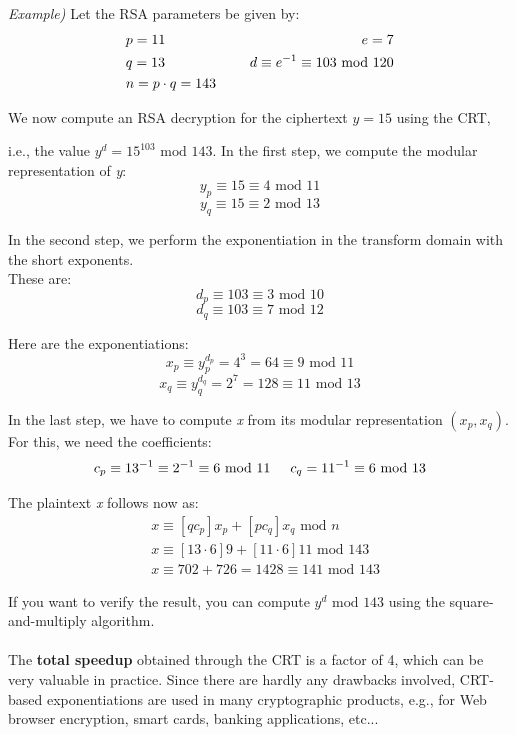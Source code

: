 \documentclass[11pt, a4paper]{article}
\newcommand{\mymod}{
    \text{ mod }
}
\begin{document}
\textit{Example)} Let the RSA parameters be given by:
\begin{alignat*}{2}
    &p=11 \hspace{0.5cm}&e=7\\
    &q=13 \hspace{0.5cm}&d\equiv e^{-1}\equiv103\mymod120\\
    &n=p\cdot q=143 \hspace{0.5cm}&
\end{alignat*}

We now compute an RSA decryption for the ciphertext $y=15$ using the CRT,

i.e., the value $y^d=15^{103}\mymod143$. In the first step, we compute the modular representation of \textit{y}:
$$y_p\equiv15\equiv4\mymod 11$$
$$y_q\equiv15\equiv2\mymod 13$$

In the second step, we perform the exponentiation in the transform domain with the short exponents.\\

These are:
$$d_p\equiv103\equiv3\mymod10$$
$$d_q\equiv103\equiv7\mymod12$$

Here are the exponentiations:
$$x_p\equiv y_p^{d_p}=4^3=64\equiv9\mymod11$$
$$x_q\equiv y_q^{d_q}=2^7=128\equiv11\mymod13$$

In the last step, we have to compute \textit{x} from its modular representation $(x_p,x_q)$.\\

For this, we need the coefficients:
$$c_p\equiv13^{-1}\equiv2^{-1}\equiv6\mymod11\hspace{0.5cm}c_q=11^{-1}\equiv6\mymod13$$

The plaintext \textit{x} follows now as:
\begin{align*}
    &x\equiv[qc_p]x_p+[pc_q]x_q\mymod n\\
    &x\equiv[13\cdot 6]9 + [11\cdot 6]11\mymod 143\\
    &x\equiv702+726=1428\equiv 141\mymod143
\end{align*}

If you want to verify the result, you can compute $y^d\mymod143$ using the square-and-multiply algorithm.\\\\
The \textbf{total speedup} obtained through the CRT is a factor of 4, which can be very valuable in practice. Since there are hardly any drawbacks involved, CRT-based exponentiations are used in many cryptographic products, e.g., for Web browser encryption, smart cards, banking applications, etc...
\end{document}
